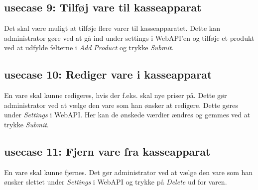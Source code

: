 \subsection*{\gls{usecase} 9: Tilføj vare til kasseapparat}
Det skal være muligt at tilføje flere varer til kasseapparatet. Dette kan \gls{administrator} gøre ved at gå ind under settings i \gls{WebAPI}'en og tilføje et produkt ved at udfylde felterne i \textit{Add Product} og trykke \textit{Submit}.

\subsection*{\gls{usecase} 10: Rediger vare i kasseapparat}
En vare skal kunne redigeres, hvis der f.eks. skal nye priser på. Dette gør \gls{administrator} ved at vælge den vare som han ønsker at redigere. Dette gøres under \textit{Settings} i \gls{WebAPI}. Her kan de ønskede værdier ændres og gemmes ved at trykke \textit{Submit}.

\subsection*{\gls{usecase} 11: Fjern vare fra kasseapparat}
En vare skal kunne fjernes. Det gør \gls{administrator} ved at vælge den vare som han ønsker slettet under \textit{Settings} i \gls{WebAPI} og trykke på \textit{Delete} ud for varen.